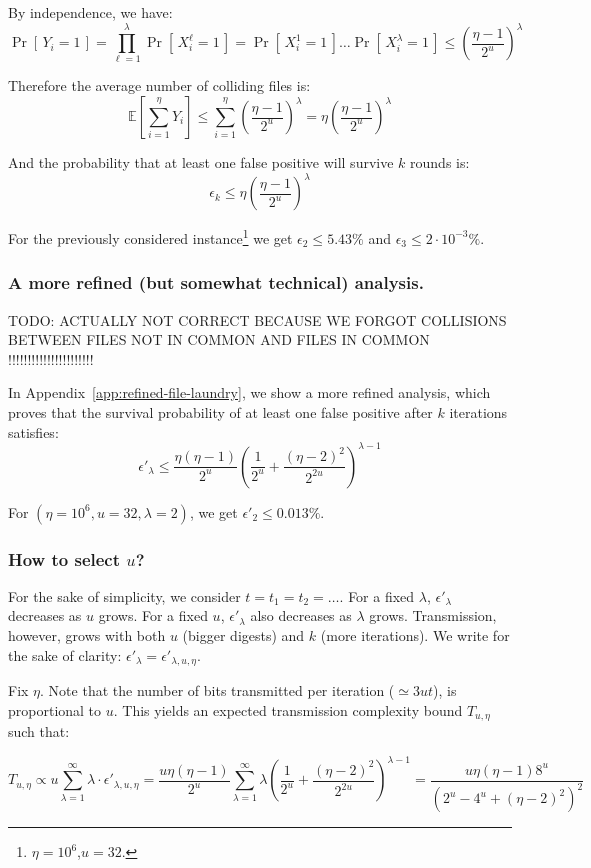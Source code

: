 \documentclass[11pt]{llncs}
\newcommand{\Prob}[1]{{\Pr\left[\,{#1}\,\right]}}
\newcommand{\EE}[1]{{\mathbb{E}\left[{#1}\right]}}
\begin{document}
By independence, we have:
\[
  \Prob{Y_i = 1} = \prod_{\ell=1}^\lambda \Prob{X^{\ell}_i = 1} = \Prob{X^1_i = 1} \dots \Prob{X^\lambda_i = 1} \le \left( \frac{\eta -1}{2^u} \right)^\lambda
\]

Therefore the average number of colliding files is:
\[
 \EE{\sum_{i=1}^{\eta} Y_i} \le \sum_{i=1}^{\eta} \left( \frac{\eta -1}{2^u} \right)^\lambda =  \eta \left(\frac{\eta - 1}{2^u}\right)^\lambda
\]

And the probability that at least one false positive will survive $k$ rounds is:
\[
\epsilon_k \le \eta \left(\frac{\eta - 1}{2^u}\right)^\lambda
\]

For the previously considered instance\footnote{$\eta=10^6$,$u=32$.} we get $\epsilon_2 \le 5.43\%$ and $\epsilon_3 \le 2 \cdot 10^{-3}\%$.

\subsubsection{A more refined (but somewhat technical) analysis.}
TODO: ACTUALLY NOT CORRECT BECAUSE WE FORGOT COLLISIONS BETWEEN FILES NOT IN COMMON AND FILES IN COMMON !!!!!!!!!!!!!!!!!!!!!!

In Appendix~\ref{app:refined-file-laundry}, we show a more refined analysis, which proves that  the survival probability of at least one false positive after $k$ iterations satisfies:
\[
\epsilon'_\lambda \le \frac{\eta(\eta-1)}{2^u} \left( \frac{1}{2^u} + \frac{(\eta-2)^2}{2^{2u}} \right)^{\lambda-1}
\]

For $(\eta=10^6,u=32,\lambda=2)$, we get $\epsilon'_2 \le 0.013\%$.


\subsubsection{How to select $u$?}
%
For the sake of simplicity, we consider $t=t_1=t_2=\dots$.
For a fixed $\lambda$, $\epsilon'_\lambda$ decreases as $u$ grows. For a fixed $u$, $\epsilon'_\lambda$ also decreases as $\lambda$ grows. Transmission, however, grows with both $u$ (bigger digests) and $k$ (more iterations). We write for the sake of clarity: $\epsilon'_\lambda = \epsilon'_{\lambda,u,\eta}$.

Fix $\eta$. Note that the number of bits transmitted per iteration ($\simeq 3ut$), is proportional to $u$. This yields an expected transmission complexity bound $T_{u,\eta}$ such that:

\[T_{u,\eta} \propto u \sum_{\lambda=1}^{\infty} \lambda \cdot \epsilon'_{\lambda,u,\eta}=
\frac{u \eta\left(\eta-1\right)}{2^u} \sum_{\lambda=1}^{\infty} \lambda \left( \frac{1}{2^u} + \frac{\left(\eta-2\right)^2}{2^{2u}} \right)^{\lambda-1}=
\frac{u \eta\left(\eta-1\right) 8^u}{\left(2^u-4^u+\left(\eta-2\right)^2\right)^2}\]
\end{document}
